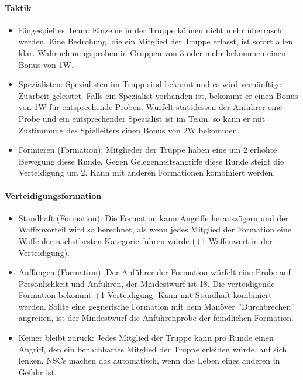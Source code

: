\documentclass{article}
\begin{document}
\paragraph{Taktik}

\begin{itemize}
\item Eingespieltes Team: Einzelne in der Truppe können nicht mehr überrascht werden. Eine Bedrohung, die ein Mitglied der Truppe erfasst, ist sofort allen klar. Wahrnehmungsproben in Gruppen von 3 oder mehr bekommen einen Bonus von 1W.
\item Spezialisten: Spezialisten im Trupp sind bekannt und es wird vernünftige Zuarbeit geleistet. Falls ein Spezialist vorhanden ist, bekommt er einen Bonus von 1W für entsprechende Proben. Würfelt stattdessen der Anführer eine Probe und ein entsprechender Spezialist ist im Team, so kann er mit Zustimmung des Spielleiters einen Bonus von 2W bekommen.
\item Formieren (Formation): Mitglieder der Truppe haben eine um 2 erhöhte Bewegung diese Runde. Gegen Gelegenheitsangriffe diese Runde steigt die Verteidigung um 2. Kann mit anderen Formationen kombiniert werden.
\end{itemize}

\paragraph{Verteidigungsformation}

\begin{itemize}
\item Standhaft (Formation): Die Formation kann Angriffe herauszögern und der Waffenvorteil wird so berechnet, als wenn jedes Mitglied der Formation eine Waffe der nächstbesten Kategorie führen würde (+1 Waffenwert in der Verteidigung).
\item Auffangen (Formation): Der Anführer der Formation würfelt eine Probe auf Persönlichkeit und Anführen, der Mindestwurf ist 18. Die verteidigende Formation bekommt +1 Verteidigung. Kann mit Standhaft kombiniert werden. Sollte eine gegnerische Formation mit dem Manöver ''Durchbrechen'' angreifen, ist der Mindestwurf die Anführenprobe der feindlichen Formation.
\item Keiner bleibt zurück: Jedes Mitglied der Truppe kann pro Runde einen Angriff, den ein benachbartes Mitglied der Truppe erleiden würde, auf sich lenken. NSCs machen das automatisch, wenn das Leben eines anderen in Gefahr ist.
\end{itemize}
\end{document}
